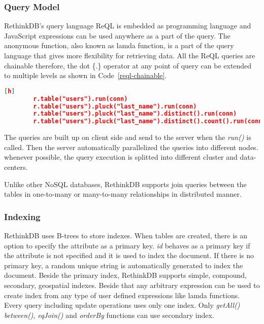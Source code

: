 \subsubsection{Query Model}
RethinkDB's query language ReQL is embedded as programming language and JavaScript expressions can be used anywhere as a part of the query. The anonymous function, also known as lamda function, is a part of the query language that gives more flexibility for retrieving data. All the ReQL queries are chainable therefore, the dot \{.\} operator at any point of query can be extended to multiple levels as shown in Code~\ref{reql-chainable}.
	\begin{lstlisting}[language=JSON,caption=Chainable Query in ReQL, label=reql-chainable, xleftmargin=-40pt][h]
		r.table("users").run(conn)
		r.table("users").pluck("last_name").run(conn)
		r.table("users").pluck("last_name").distinct().run(conn)
		r.table("users").pluck("last_name").distinct().count().run(conn)
	\end{lstlisting} 
The queries are built up on client side and send to the server when the \textit{run()} is called. Then the server automatically parallelized the queries into different nodes. whenever possible, the query execution is splitted into different cluster and data-centers.
\par
Unlike other NoSQL databases, RethinkDB supports join queries between the tables in one-to-many or many-to-many relationships in distributed manner. 
\subsubsection{Indexing}
	RethinkDB uses B-trees to store indexes. When tables are created, there is an option to specify the attribute as a primary key. \textit{id} behaves as a primary key if the attribute is not specified and it is used to index the document. If there is no  primary key, a random unique string is automatically generated to index the document. Beside the primary index, RethinkDB supports simple, compound, secondary, geospatial indexes. Beside that any arbitrary expression can be used to create index from any type of user defined expressions like lamda functions. Every query including update operations uses only one index.
	 Only \textit{getAll()} \textit{between()}, \textit{eqJoin()} and \textit{orderBy} functions can use secondary index.